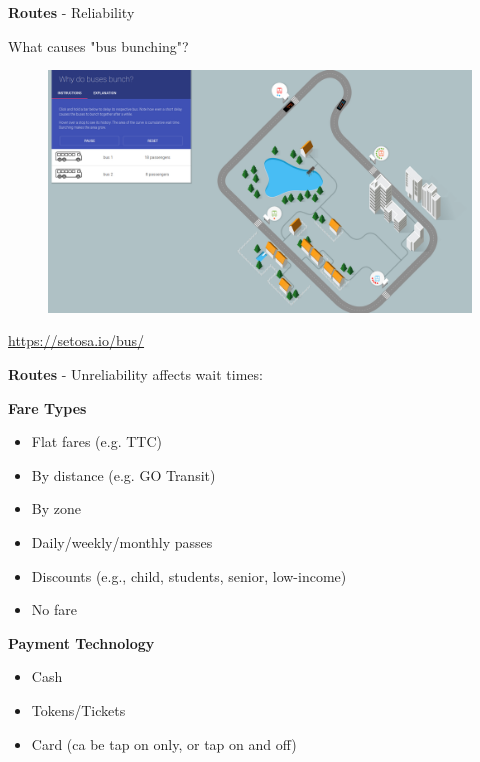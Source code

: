 \documentclass[aspectratio=169]{beamer}
\begin{document}
\begin{frame}
	
	\textbf{Routes} - Reliability
	
	\vspace{2mm}
	
	What causes "bus bunching"?
	
	\begin{figure}
		\centering
		\includegraphics[width=0.8\linewidth]{images/bus-bunching.png}
	\end{figure}
	
	
	\tiny \url{https://setosa.io/bus/}
	
\end{frame}



\begin{frame}
	
	\textbf{Routes} - Unreliability affects wait times:
	
	
	
	
\end{frame}





\begin{frame}
	
	\textbf{Fare Types}
	\begin{itemize}
		\item Flat fares (e.g. TTC)
		\item By distance (e.g. GO Transit)
		\item By zone
		\item Daily/weekly/monthly passes
		\item Discounts (e.g., child, students, senior, low-income)
		\item No fare
	\end{itemize}

	\textbf{Payment Technology}
	\begin{itemize}
		\item Cash
		\item Tokens/Tickets
		\item Card (ca be tap on only, or tap on and off)
	\end{itemize}
	
	
\end{frame}
\end{document}
